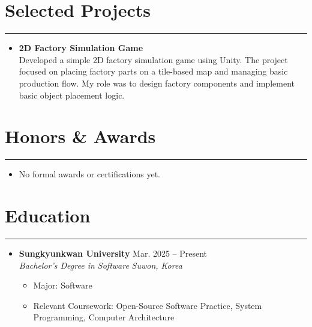 \documentclass[letterpaper, 10pt]{article}
\begin{document}
\section*{Selected Projects}
\hrule 
\vspace{4pt}
\begin{itemize}
 \item \textbf{2D Factory Simulation Game} \\
 Developed a simple 2D factory simulation game using Unity. 
 The project focused on placing factory parts on a tile-based map and managing basic production flow. 
 My role was to design factory components and implement basic object placement logic.
\end{itemize}
\section*{Honors \& Awards}
\hrule
\vspace{4pt}
\begin{itemize}
 \item No formal awards or certifications yet.
\end{itemize}
\section*{Education}
\hrule
\vspace{4pt}
\begin{itemize}
 \item \textbf{Sungkyunkwan University} \hfill Mar. 2025 -- Present \\
 \textit{Bachelor's Degree in Software} \hfill \textit{Suwon, Korea}
 \begin{itemize}
  \item Major: Software
  \item Relevant Coursework: Open-Source Software Practice, System Programming, Computer Architecture
 \end{itemize}
\end{itemize}
\end{document}
